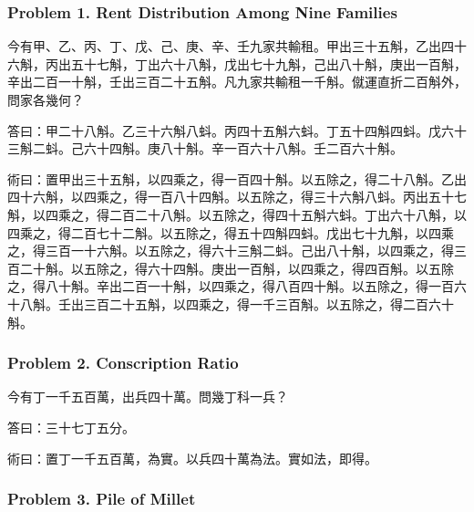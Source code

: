 \documentclass[11pt,a4paper]{article}
\newcommand{\zh}[1]{{\CJKfamily{}#1}}
\begin{document}
\subsubsection*{Problem 1. Rent Distribution Among Nine Families}

\begin{problembox}[title=\zh{問}]
\zh{今有甲、乙、丙、丁、戊、己、庚、辛、壬九家共輸租。甲出三十五斛，乙出四十六斛，丙出五十七斛，丁出六十八斛，戊出七十九斛，己出八十斛，庚出一百斛，辛出二百一十斛，壬出三百二十五斛。凡九家共輸租一千斛。僦運直折二百斛外，問家各幾何？}
\end{problembox}
\begin{answerbox}[title=\zh{答}]
\zh{答曰：甲二十八斛。乙三十六斛八蚪。丙四十五斛六蚪。丁五十四斛四蚪。戊六十三斛二蚪。己六十四斛。庚八十斛。辛一百六十八斛。壬二百六十斛。}
\end{answerbox}
\begin{methodbox}[title=\zh{術}]
\zh{術曰：置甲出三十五斛，以四乘之，得一百四十斛。以五除之，得二十八斛。乙出四十六斛，以四乘之，得一百八十四斛。以五除之，得三十六斛八蚪。丙出五十七斛，以四乘之，得二百二十八斛。以五除之，得四十五斛六蚪。丁出六十八斛，以四乘之，得二百七十二斛。以五除之，得五十四斛四蚪。戊出七十九斛，以四乘之，得三百一十六斛。以五除之，得六十三斛二蚪。己出八十斛，以四乘之，得三百二十斛。以五除之，得六十四斛。庚出一百斛，以四乘之，得四百斛。以五除之，得八十斛。辛出二百一十斛，以四乘之，得八百四十斛。以五除之，得一百六十八斛。壬出三百二十五斛，以四乘之，得一千三百斛。以五除之，得二百六十斛。}
\end{methodbox}

\subsubsection*{Problem 2. Conscription Ratio}

\begin{problembox}[title=\zh{問}]
\zh{今有丁一千五百萬，出兵四十萬。問幾丁科一兵？}
\end{problembox}
\begin{answerbox}[title=\zh{答}]
\zh{答曰：三十七丁五分。}
\end{answerbox}
\begin{methodbox}[title=\zh{術}]
\zh{術曰：置丁一千五百萬，為實。以兵四十萬為法。實如法，即得。}
\end{methodbox}

\subsubsection*{Problem 3. Pile of Millet}
\end{document}
